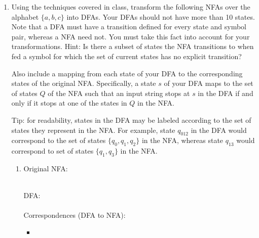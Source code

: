\documentclass[11pt]{article}
\begin{document}
\begin{enumerate}
\newpage

\item Using the techniques covered in class, transform the following NFAs over the alphabet $\{a, b, c\}$ into DFAs. Your DFAs should not have more than 10 states.  Note that a DFA must have a transition defined for every state and symbol pair, whereas a NFA need not. You must take this fact into account for your transformations. Hint: Is there a subset of states the NFA transitions to when fed a symbol for which the set of current states has no explicit transition?

Also include a mapping from each state of your DFA to the corresponding states of the original NFA.  Specifically, a state $s$ of your DFA maps to the set of states $Q$ of the NFA such that an input string stops at $s$ in the DFA if and only if it stops at one of the states in $Q$ in the NFA.

Tip: for readability, states in the DFA may be labeled according to the set of states they represent in the NFA.  For example, state $q_{012}$ in the DFA would correspond to the set of states $\{q_0, q_1, q_2\}$ in the NFA, whereas state $q_{13}$ would correspond to set of states $\{q_1, q_3\}$ in the NFA.


\begin{enumerate}
    \item Original NFA:\\
    \\
    DFA: \\
    \\
    Correspondences (DFA to NFA):
    \begin{itemize}
        \item %
    \end{itemize}


\end{enumerate}
\end{enumerate}
\end{document}

